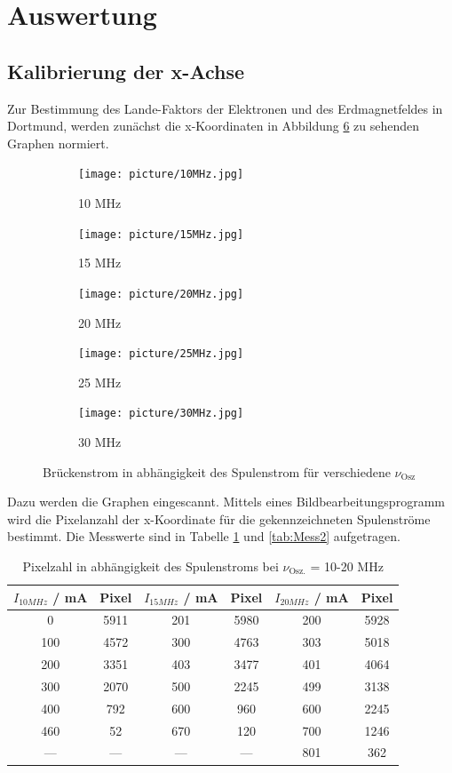 \section{Auswertung}
\label{sec:Auswertung}

\subsection{Kalibrierung der x-Achse}
Zur Bestimmung des Lande-Faktors der Elektronen und des Erdmagnetfeldes in Dortmund, werden zunächst die x-Koordinaten in Abbildung \ref{fig:Skizze} zu sehenden Graphen normiert.
\begin{figure}
  \centering
  \begin{subfigure}[b]{0.49\textwidth}
     \texttt{[image: picture/10MHz.jpg]}
     \caption{10 MHz}
     \label{fig:10Skiz}
  \end{subfigure}
  \begin{subfigure}[b]{0.49\textwidth}
     \texttt{[image: picture/15MHz.jpg]}
     \caption{15 MHz}
     \label{fig:15Skiz}
  \end{subfigure}
  \begin{subfigure}[b]{0.49\textwidth}
     \texttt{[image: picture/20MHz.jpg]}
     \caption{20 MHz}
     \label{fig:20Skiz}
  \end{subfigure}
  \begin{subfigure}[b]{0.49\textwidth}
     \texttt{[image: picture/25MHz.jpg]}
     \caption{25 MHz}
     \label{fig:25Skiz}
  \end{subfigure}
  \begin{subfigure}[b]{0.49\textwidth}
     \texttt{[image: picture/30MHz.jpg]}
     \caption{30 MHz}
     \label{fig:30Skiz}
  \end{subfigure}
  \caption{Brückenstrom in abhängigkeit des Spulenstrom für verschiedene $\nu_\text{Osz}$}
  \label{fig:Skizze}
\end{figure}
Dazu werden die Graphen eingescannt. Mittels eines Bildbearbeitungsprogramm wird die Pixelanzahl der x-Koordinate für die gekennzeichneten Spulenströme bestimmt. Die Messwerte sind in Tabelle \ref{tab:Mess1} und \ref{tab:Mess2} aufgetragen. 
\begin{table}
  \centering
  \caption{Pixelzahl in abhängigkeit des Spulenstroms bei $\nu_\text{Osz.}$ = 10-20 MHz}
  \begin{tabular}{c c|c c|c c}
    \toprule
    	$I_{10 MHz}$ / mA & Pixel & $I_{15MHz}$ / mA & Pixel & $I_{20MHz}$ / mA & Pixel \\    
    \midrule
	0   & 5911 & 201 & 5980 & 200 & 5928 \\
	100 & 4572 & 300 & 4763 & 303 & 5018 \\
	200 & 3351 & 403 & 3477 & 401 & 4064 \\
	300 & 2070 & 500 & 2245 & 499 & 3138 \\
	400 & 792  & 600 & 960  & 600 & 2245 \\
	460 & 52   & 670 & 120  & 700 & 1246 \\
	--- & ---  & --- & ---  & 801 & 362  \\
    \bottomrule 
  \end{tabular}
  \label{tab:Mess1}
\end{table}
